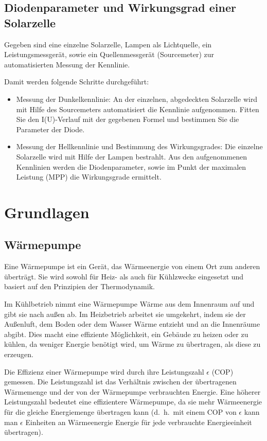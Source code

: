 \documentclass[12pt,english,ngerman]{scrartcl}
\begin{document}
\subsection{Diodenparameter und Wirkungsgrad einer Solarzelle}

Gegeben sind eine einzelne Solarzelle, Lampen als Lichtquelle, ein
Leistungsmessgerät, sowie ein Quellenmessgerät (Sourcemeter) zur
automatisierten Messung der Kennlinie.

Damit werden folgende Schritte durchgeführt:

\begin{itemize}
	\item Messung der Dunkelkennlinie: An der einzelnen, abgedeckten Solarzelle wird mit
	      Hilfe des Sourcemeters automatisiert die Kennlinie aufgenommen. Fitten Sie den
	      I(U)-Verlauf mit der gegebenen Formel und bestimmen Sie die Parameter der
	      Diode.
	\item Messung der Hellkennlinie und Bestimmung des Wirkungsgrades: Die einzelne
	      Solarzelle wird mit Hilfe der Lampen bestrahlt. Aus den aufgenommenen
	      Kennlinien werden die Diodenparameter, sowie im Punkt der maximalen Leistung
	      (MPP) die Wirkungsgrade ermittelt.
\end{itemize}

\section{Grundlagen}\label{Grund}

\subsection{Wärmepumpe}
Eine Wärmepumpe ist ein Gerät, das Wärmeenergie von einem Ort zum anderen
überträgt. Sie wird sowohl für Heiz- als auch für Kühlzwecke eingesetzt und
basiert auf den Prinzipien der Thermodynamik.

Im Kühlbetrieb nimmt eine Wärmepumpe Wärme aus dem Innenraum auf und gibt sie
nach außen ab. Im Heizbetrieb arbeitet sie umgekehrt, indem sie der Außenluft,
dem Boden oder dem Wasser Wärme entzieht und an die Innenräume abgibt. Dies
macht eine effiziente Möglichkeit, ein Gebäude zu heizen oder zu kühlen, da
weniger Energie benötigt wird, um Wärme zu übertragen, als diese zu erzeugen.

Die Effizienz einer Wärmepumpe wird durch ihre Leistungszahl $\epsilon$ (COP)
gemessen. Die Leistungszahl ist das Verhältnis zwischen der übertragenen
Wärmemenge und der von der Wärmepumpe verbrauchten Energie. Eine höherer
Leistungszahl bedeutet eine effizientere Wärmepumpe, da sie mehr Wärmeenergie
für die gleiche Energiemenge übertragen kann (d.\ h.\ mit einem COP von
$\epsilon$ kann man $\epsilon$ Einheiten an Wärmeenergie Energie für jede
verbrauchte Energieeinheit übertragen).
\end{document}
